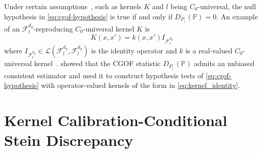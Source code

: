 \documentclass{uai2023} %
\begin{document}
Under certain assumptions~\citep[Theorem~1]{jitkrittum2020testing}, such as kernels $K$ and $l$ being $C_0$-universal,
the null hypothesis in \cref{eq:cgof-hypothesis} is true if and only if $D_{P_{|\cdot}}(\mathbb{P}) = 0$.
An example of an $\mathcal
F^{d_y}_l$-reproducing $C_0$-universal kernel $K$ is
\begin{equation}\label{eq:kernel_identity}
K(x, x') = k(x, x')I_{\mathcal{F}_l^{d_y}}
\end{equation}
where $I_{\mathcal{F}_l^{d_y}} \in \mathcal  L(\mathcal  F^{d_y}_l, \mathcal  F^{d_y}_{l})$ is the identity operator and $k$ is a real-valued $C_0$-universal kernel~\citep{carmeli2010vector}.
\citet{jitkrittum2020testing} showed that the CGOF statistic $D_{P_{|\cdot}}(\mathbb{P})$
admits an unbiased consistent estimator and used it to construct hypothesis tests of \cref{eq:cgof-hypothesis} with operator-valued kernels of the form in \cref{eq:kernel_identity}.

\section{Kernel Calibration-Conditional Stein Discrepancy}\label{sec:calibration-as-cgof}
\end{document}
